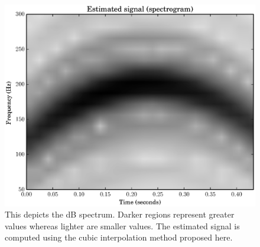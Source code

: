 \begin{figure}[!t]
    \centering
    \includegraphics[width=\figwidthscale\textwidth]{plots/mq_mod_cubic_estimated_spec.eps}
    \caption{This depicts the dB spectrum. Darker regions represent greater
        values whereas lighter are smaller values. The estimated signal is
        computed using the cubic interpolation method proposed here.
    \label{plot:mqmodcubicestimatedspec}}
\end{figure}



